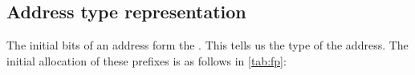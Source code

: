 







\subsection{Address type representation}

The initial bits of an address form the . This tells us
the type of the address. The initial allocation of these prefixes is as follows
in \cref{tab:fp}:

